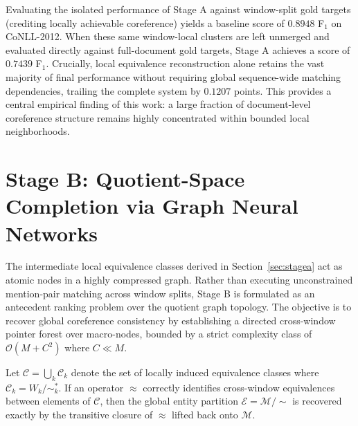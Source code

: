 \documentclass[12pt]{article}
\begin{document}
	Evaluating the isolated performance of Stage A against window-split gold targets (crediting locally achievable coreference) yields a baseline score of $0.8948$ F$_1$ on CoNLL-2012. When these same window-local clusters are left unmerged and evaluated directly against full-document gold targets, Stage A achieves a score of $0.7439$ F$_1$. Crucially, local equivalence reconstruction alone retains the vast majority of final performance without requiring global sequence-wide matching dependencies, trailing the complete system by $0.1207$ points. This provides a central empirical finding of this work: a large fraction of document-level coreference structure remains highly concentrated within bounded local neighborhoods.
	
	\section{Stage B: Quotient-Space Completion via Graph Neural Networks}\label{sec:stageb}
	The intermediate local equivalence classes derived in Section~\ref{sec:stagea} act as atomic nodes in a highly compressed graph. Rather than executing unconstrained mention-pair matching across window splits, Stage B is formulated as an antecedent ranking problem over the quotient graph topology. The objective is to recover global coreference consistency by establishing a directed cross-window pointer forest over macro-nodes, bounded by a strict complexity class of $\mathcal{O}(M + C^2)$ where $C \ll M$.
	
	\begin{proposition}
		Let $\mathcal{C} = \bigcup_k \mathcal{C}_k$ denote the set of locally induced equivalence classes where $\mathcal{C}_k = W_k / \sim_k^*$. If an operator $\approx$ correctly identifies cross-window equivalences between elements of $\mathcal{C}$, then the global entity partition $\mathcal{E} = \mathcal{M}/\sim$ is recovered exactly by the transitive closure of $\approx$ lifted back onto $\mathcal{M}$.
	\end{proposition}
	
\end{document}

